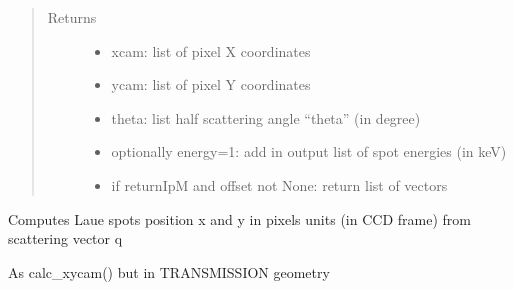 \documentclass[letterpaper,10pt,english]{sphinxmanual}
\begin{document}
\begin{fulllineitems}
\begin{quote}
\begin{description}
\begin{itemize}
\end{itemize}

\item[{Returns}] \leavevmode
\begin{itemize}
\item {} 
xcam: list of pixel X coordinates

\item {} 
ycam: list of pixel Y coordinates

\item {} 
theta: list half scattering angle “theta” (in degree)

\item {} 
optionally energy=1: add in output list of spot energies (in keV)

\item {} 
if returnIpM and offset not None: return list of vectors 

\end{itemize}


\end{description}\end{quote}

\end{fulllineitems}


\begin{fulllineitems}
\label{\detokenize{Simulation_Module:LaueTools.LaueGeometry.calc_xycam_transmission}}
Computes Laue spots position x and y in pixels units (in CCD frame) from scattering vector q

As calc\_xycam() but in TRANSMISSION geometry

\end{fulllineitems}

\end{document}

